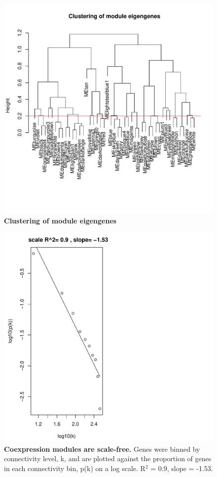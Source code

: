 \begin{figure}[ht!]
      \centering
       \includegraphics[width=\linewidth]{CapMergeLine}
    \caption{\textbf{Clustering of module eigengenes}}
    \label{fig:fsCLust}
\end{figure}


\begin{figure}[ht!]
      \centering
       \includegraphics[width=\linewidth]{ScaleFree}
    \caption{\textbf{Coexpression modules are scale-free.} Genes were binned by connectivity level, k, and are plotted against the proportion of genes in each connectivity bin, p(k) on a log scale. R$^{2}$ = 0.9, slope = -1.53.}
    \label{fig:fsScale}
\end{figure}


